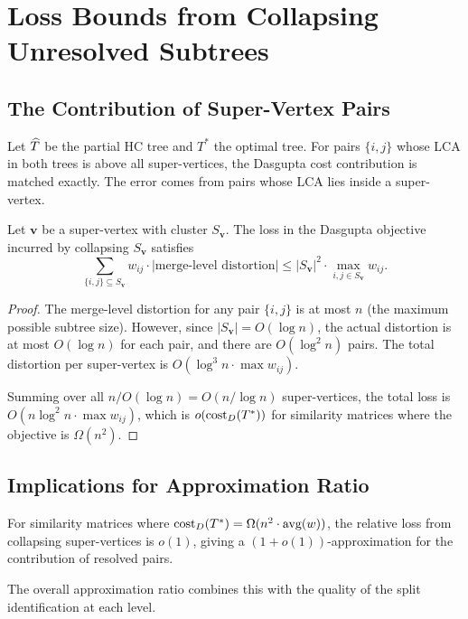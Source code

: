\chapter{Loss Bounds from Collapsing Unresolved Subtrees}
\label{app:collapse_loss}

\section{The Contribution of Super-Vertex Pairs}

Let $\widehat{T}$ be the partial HC tree and $T^*$ the optimal tree. For pairs $\{i,j\}$ whose LCA in both trees is above all super-vertices, the Dasgupta cost contribution is matched exactly. The error comes from pairs whose LCA lies inside a super-vertex.

\begin{theorem}
Let $\mathbf{v}$ be a super-vertex with cluster $S_\mathbf{v}$. The loss in the Dasgupta objective incurred by collapsing $S_\mathbf{v}$ satisfies
\[
\sum_{\{i,j\} \subseteq S_\mathbf{v}} w_{ij} \cdot |\text{merge-level distortion}| \leq |S_\mathbf{v}|^2 \cdot \max_{i,j \in S_\mathbf{v}} w_{ij}.
\]
\end{theorem}

\begin{proof}
The merge-level distortion for any pair $\{i,j\}$ is at most $n$ (the maximum possible subtree size). However, since $|S_\mathbf{v}| = O(\log n)$, the actual distortion is at most $O(\log n)$ for each pair, and there are $O(\log^2 n)$ pairs. The total distortion per super-vertex is $O(\log^3 n \cdot \max w_{ij})$.

Summing over all $n / O(\log n) = O(n / \log n)$ super-vertices, the total loss is $O(n \log^2 n \cdot \max w_{ij})$, which is $o(\operatorname{cost}_D(T^*))$ for similarity matrices where the objective is $\Omega(n^2)$.
\end{proof}

\section{Implications for Approximation Ratio}

\begin{corollary}
For similarity matrices where $\operatorname{cost}_D(T^*) = \Omega(n^2 \cdot \text{avg}(w))$, the relative loss from collapsing super-vertices is $o(1)$, giving a $(1 + o(1))$-approximation for the contribution of resolved pairs.
\end{corollary}

The overall approximation ratio combines this with the quality of the split identification at each level.


